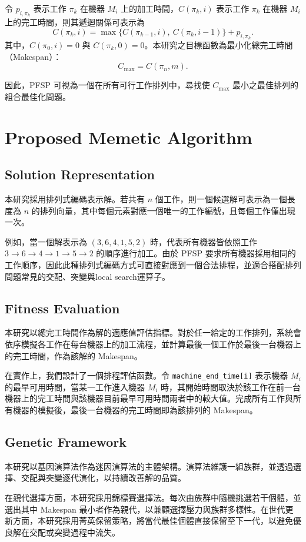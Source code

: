 \documentclass[conference]{IEEEtran}
\begin{document}
令 \(p_{i,\pi_k}\) 表示工作 \(\pi_k\) 在機器 \(M_i\) 上的加工時間，\(C(\pi_k, i)\) 表示工作 \(\pi_k\) 在機器 \(M_i\) 上的完工時間，則其遞迴關係可表示為
\[C(\pi_k, i) = \max \{ C(\pi_{k-1}, i),\ C(\pi_k, i-1) \} + p_{i,\pi_k}.\]
其中，\(C(\pi_0, i) = 0\) 與 \(C(\pi_k, 0) = 0\)。本研究之目標函數為最小化總完工時間（Makespan）：
\[C_{\max} = C(\pi_n, m).\]

因此，PFSP 可視為一個在所有可行工作排列中，尋找使 \(C_{\max}\) 最小之最佳排列的組合最佳化問題。

\section{Proposed Memetic Algorithm}
\subsection{Solution Representation}
本研究採用排列式編碼表示解。若共有 \(n\) 個工作，則一個候選解可表示為一個長度為 \(n\) 的排列向量，其中每個元素對應一個唯一的工作編號，且每個工作僅出現一次。

例如，當一個解表示為 \((3,6,4,1,5,2)\) 時，代表所有機器皆依照工作 \(3 \rightarrow 6 \rightarrow 4 \rightarrow 1 \rightarrow 5 \rightarrow 2\) 的順序進行加工。由於 PFSP 要求所有機器採用相同的工作順序，因此此種排列式編碼方式可直接對應到一個合法排程，並適合搭配排列問題常見的交配、突變與local search運算子。
\subsection{Fitness Evaluation}
本研究以總完工時間作為解的適應值評估指標。對於任一給定的工作排列，系統會依序模擬各工作在每台機器上的加工流程，並計算最後一個工作於最後一台機器上的完工時間，作為該解的 Makespan。

在實作上，我們設計了一個排程評估函數。令 \texttt{machine\_end\_time[i]} 表示機器 \(M_i\) 的最早可用時間，當某一工作進入機器 \(M_i\) 時，其開始時間取決於該工作在前一台機器上的完工時間與該機器目前最早可用時間兩者中的較大值。完成所有工作與所有機器的模擬後，最後一台機器的完工時間即為該排列的 Makespan。
\subsection{Genetic Framework}

本研究以基因演算法作為迷因演算法的主體架構。演算法維護一組族群，並透過選擇、交配與突變逐代演化，以持續改善解的品質。

在親代選擇方面，本研究採用錦標賽選擇法。每次由族群中隨機挑選若干個體，並選出其中 Makespan 最小者作為親代，以兼顧選擇壓力與族群多樣性。在世代更新方面，本研究採用菁英保留策略，將當代最佳個體直接保留至下一代，以避免優良解在交配或突變過程中流失。
\end{document}
